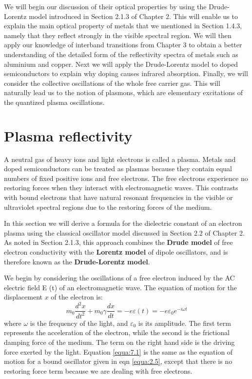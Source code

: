 \documentclass[12pt]{book}
\begin{document}
{\begin{shaded}
We will begin our discussion of their optical properties by using the Drude-Lorentz model introduced in Section 2.1.3 of Chapter 2. This will enable us to explain the main optical property of metals that we mentioned in Section 1.4.3, namely that they reflect strongly in the visible spectral region. We will then apply our knowledge of interband transitions from Chapter 3 to obtain a better understanding of the detailed form of the reflectivity spectra of metals such as aluminium and copper. Next we will apply the Drude-Lorentz model to doped semiconductors to explain why doping causes infrared absorption. Finally, we will consider the collective oscillations of the whole free carrier gas. This will naturally lead us to the notion of plasmons, which are elementary excitations of the quantized plasma oscillations.
\end{shaded}

\section{Plasma reflectivity}
A neutral gas of heavy ions and light electrons is called a plasma. Metals and doped semiconductors can be treated as plasmas because they contain equal numbers of fixed positive ions and free electrons. The free electrons experience no restoring forces when they interact with electromagnetic waves. This contrasts with bound electrons that have natural resonant frequencies in the visible or ultraviolet spectral regions due to the restoring forces of the medium.

In this section we will derive a formula for the dielectric constant of an electron plasma using the classical oscillator model discussed in Section 2.2 of Chapter 2. As noted in Section 2.1.3, this approach combines the \textbf{Drude model} of free electron conductivity with the \textbf{Lorentz model} of dipole oscillators, and is therefore known as the \textbf{Drude-Lorentz model}.

We begin by considering the oscillations of a free electron induced by the AC electric field E (t) of an electromagnetic wave. The equation of motion for the displacement $x$ of the electron is:
\begin{equation}\label{equa:7.1}
  m_0\frac{d^2x}{dt^2}+m_0\gamma\frac{dx}{dt}=-e\varepsilon(t)=-e\varepsilon_0e^{-i\omega t}
\end{equation}
where $\omega$ is the frequency of the light, and $\varepsilon_0$ is its amplitude. The first term represents the acceleration of the electron, while the second is the frictional damping force of the medium. The term on the right hand side is the driving force exerted by the light. Equation \ref{equa:7.1} is the same as the equation of motion
for a bound oscillator given in eqn \ref{equa:2.5}, except that there is no restoring force term because we are dealing with free electrons.

}
\end{document}
